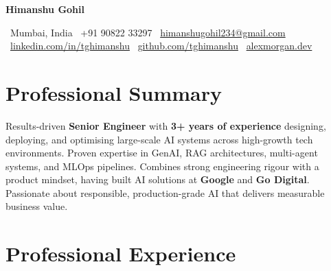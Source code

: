 \documentclass[11pt, a4paper]{article}
\newcommand{\resumename}[1]{%
    {\Huge\bfseries\color{darkgray} #1}\par
}
\newcommand{\tagline}[1]{%
    \vspace{2pt}{\large\color{midgray} #1}\par
}
\begin{document}
\pagestyle{empty}

\begin{center}
    \resumename{Himanshu Gohil}
    \tagline{Senior Engineer}
    \vspace{6pt}
    \small
    ~Mumbai, India \quad
    ~+91 90822 33297 \quad
    ~\href{mailto:himanshugohil234@gmail.com}{himanshugohil234@gmail.com} \\[4pt]
    ~\href{https://linkedin.com/in/tghimanshu}{linkedin.com/in/tghimanshu} \quad
    ~\href{https://github.com/tghimanshu}{github.com/tghimanshu} \quad
    ~\href{https://tghimanshu.github.io}{alexmorgan.dev}
\end{center}

\vspace{4pt}

\section{Professional Summary}

Results-driven \textbf{Senior Engineer} with \textbf{3+ years of experience} designing, deploying, and optimising large-scale AI systems across high-growth tech environments. Proven expertise in GenAI, RAG architectures, multi-agent systems, and MLOps pipelines. Combines strong engineering rigour with a product mindset, having built AI solutions at \textbf{Google} and \textbf{Go Digital}. Passionate about responsible, production-grade AI that delivers measurable business value.

\vspace{2pt}

\section{Professional Experience}
\end{document}
